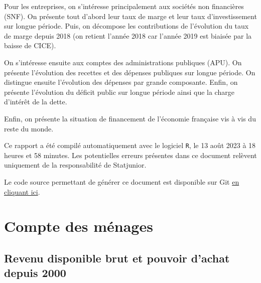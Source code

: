 \documentclass[
  paper=a4,
  ,captions=tableheading
]{scrartcl}
\begin{document}
Pour les entreprises, on s'intéresse principalement aux sociétés non
financières (SNF). On présente tout d'abord leur taux de marge et leur
taux d'investissement sur longue période. Puis, on décompose les
contributions de l'évolution du taux de marge depuis 2018 (on retient
l'année 2018 car l'année 2019 est biaisée par la baisse de CICE).

On s'intéresse ensuite aux comptes des administrations publiques (APU).
On présente l'évolution des recettes et des dépenses publiques sur
longue période. On distingue ensuite l'évolution des dépenses par grande
composante. Enfin, on présente l'évolution du déficit public sur longue
période ainsi que la charge d'intérêt de la dette.

Enfin, on présente la situation de financement de l'économie française
vis à vis du reste du monde.

Ce rapport a été compilé automatiquement avec le logiciel \texttt{R}, le
13 août 2023 à 18 heures et 58 minutes. Les potentielles erreurs
présentes dans ce document relèvent uniquement de la responsabilité de
Statjunior.

Le code source permettant de générer ce document est disponible sur Git
\href{https://github.com/statjunior/Statjunior/tree/main/Conjoncture\%20-\%20comptes\%20trimestriels/}{en
cliquant ici}.

\hypertarget{compte-des-muxe9nages}{%
\section{Compte des ménages}\label{compte-des-muxe9nages}}

\hypertarget{revenu-disponible-brut-et-pouvoir-dachat-depuis-2000}{%
\subsection{Revenu disponible brut et pouvoir d'achat depuis
2000}\label{revenu-disponible-brut-et-pouvoir-dachat-depuis-2000}}
\end{document}
